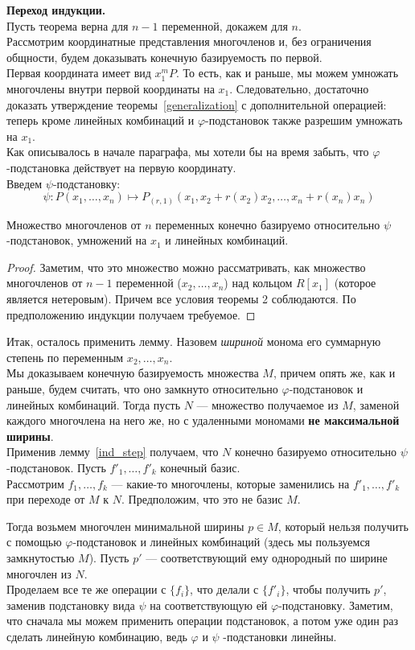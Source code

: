 \vskip 0.1in\noindent
{\large\textbf{Переход индукции.}}\\
Пусть теорема верна для $n-1$ переменной, докажем для $n$.\\
Рассмотрим координатные представления многочленов и, без ограничения общности, будем доказывать конечную базируемость по первой.\\
Первая координата имеет вид $x_1^m P$.
То есть, как и раньше, мы можем умножать многочлены внутри первой координаты на $x_1$.
Следовательно, достаточно доказать утверждение теоремы~\ref{generalization} с дополнительной операцией: теперь кроме линейных комбинаций и $\varphi$-подстановок также разрешим умножать на $x_1$.\\
Как описывалось в начале параграфа, мы хотели бы на время забыть, что $\varphi$-подстановка действует на первую координату. \\Введем $\psi$-подстановку:
\[\psi : P(x_1,\ldots,x_n) \mapsto P_{(r,1)}(x_1,x_2+r(x_2)x_2,\ldots,x_n+r(x_n)x_n)\]\vskip 0.1in\noindent
\begin{lemma}
    \label{ind_step}
    Множество многочленов от $n$ переменных конечно базируемо относительно $\psi$-подстановок, умножений на $x_1$ и линейных комбинаций.
\end{lemma}
\begin{proof}
    Заметим, что это множество можно рассматривать, как множество многочленов от $n-1$ переменной ($x_2,\ldots,x_n$) над кольцом $R[x_1]$ (которое является нетеровым).
    Причем все условия теоремы 2 соблюдаются.
    По предположению индукции получаем требуемое.
\end{proof}
Итак, осталось применить лемму.
Назовем \textit{шириной} монома его суммарную степень по переменным $x_2,\ldots,x_n$.\\
Мы доказываем конечную базируемость множества $M$, причем опять же, как и раньше, будем считать, что оно замкнуто относительно $\varphi$-подстановок и линейных комбинаций.
Тогда пусть $N$ --- множество получаемое из $M$, заменой каждого многочлена на него же, но с удаленными мономами \textbf{не максимальной ширины}.\\
Применив лемму~\ref{ind_step} получаем, что $N$ конечно базируемо относительно $\psi$-подстановок.
Пусть $f'_1,\ldots,f'_k$ конечный базис.\\
Рассмотрим $f_1,\ldots,f_k$ --- какие-то многочлены, которые заменились на $f'_1,\ldots,f'_k$ при переходе от $M$ к $N$.
Предположим, что это не базис $M$.

Тогда возьмем многочлен минимальной ширины $p\in M$, который нельзя получить с помощью $\varphi$-подстановок и линейных комбинаций (здесь мы пользуемся замкнутостью $M$).
Пусть $p'$ --- соответствующий ему однородный по ширине многочлен из $N$.\\
Проделаем все те же операции с $\{f_i\}$, что делали с $\{f'_i\}$, чтобы получить $p'$, заменив подстановку вида $\psi$ на соответствующую ей $\varphi$-подстановку.
Заметим, что сначала мы можем применить операции подстановок, а потом уже один раз сделать линейную комбинацию, ведь $\varphi$ и $\psi$ -подстановки линейны.

